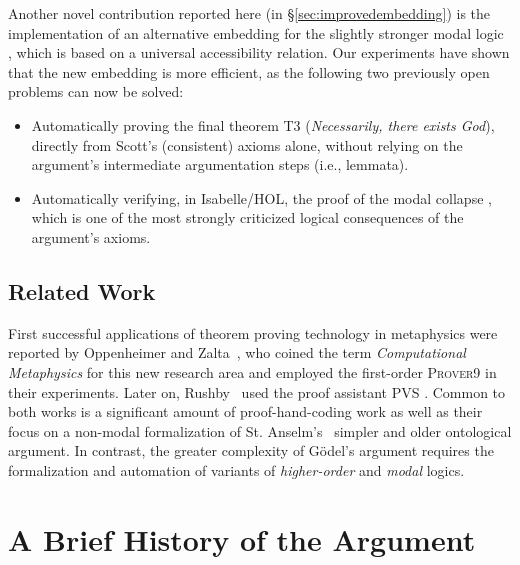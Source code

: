 \documentclass{article}
\begin{document}
Another novel contribution reported here (in
\S\ref{sec:improvedembedding}) is the implementation of an alternative
embedding for the slightly stronger modal logic \SFiveU, which is
based on a universal accessibility relation. Our experiments have
shown that the new embedding is more efficient, as the following two
previously open problems can now be solved:
\begin{itemize}
\item Automatically proving the final theorem T3 (\textit{Necessarily, there
  exists God}), directly from Scott's  (consistent) axioms
  alone, without relying on the argument's intermediate argumentation
  steps (i.e., lemmata).
\item Automatically verifying, in Isabelle/HOL, the proof of the modal
  collapse \cite{Sobel}, which is one of the most strongly criticized
  logical consequences of the argument's axioms.
\end{itemize}


\subsection{Related Work}

First successful applications of theorem proving technology in
metaphysics were reported by Oppenheimer and
Zalta~, who coined the term \textit{Computational Metaphysics} for this new research area and employed the first-order
\textsc{Prover9} \cite{prover9-mace4} in their experiments. Later on, Rushby~ used the proof assistant \textsc{PVS} \cite{cade92-pvs}. Common to both
works is a significant amount of proof-hand-coding work as well as their
focus on a non-modal formalization of St. Anselm's~ simpler 
and older ontological argument. In contrast, the greater complexity of G\"odel's argument requires the formalization and automation of variants of \emph{higher-order} and \emph{modal} logics.


\section{A Brief History of the Argument}\label{sec:history}
\end{document}
